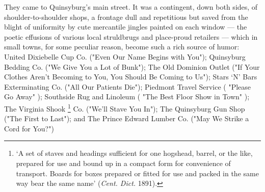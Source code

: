   They came to Quinsyburg's main street. It was a contingent, 
down both sides, of shoulder-to-shoulder shops, a frontage 
dull and repetitious but saved from the blight 
of uniformity by cute mercantile jingles 
painted on each window --- the poetic effusions 
of various local struldbrugs 
and place-proud retailers --- which in small towns, for some peculiar reason, 
become such a rich source of humor:
United Dixiebelle Cup Co. ("Even Our Name Begins with You"); Quinsyburg Bedding
Co. ("We Give You a Lot of Bunk"); 
The Old Dominion Outlet ("If Your Clothes Aren't Becoming to You, You Should 
Be Coming to Us"); Stars `N' Bars Exterminating 
Co. ("All Our Patients Die"); Piedmont Travel Service ( "Please Go Away" ); 
Southside Rug and Linoleum 
( "The Best Floor Show in Town" ); The Virginia Shook 
\footnote{‘A set of staves and headings sufficient for one hogshead, barrel, or
the like, prepared for use and bound up in a compact form for convenience of
transport. Boards for boxes prepared or fitted for use and packed in the same
way bear the same name’ (\textit{Cent. Dict.} 1891).
}
Co. ("We'll Stave 
You In"); The Quinsyburg Gun Shop ("The First to Last"); and The Prince 
Edward Lumber Co. ("May We Strike a Cord for You?")

